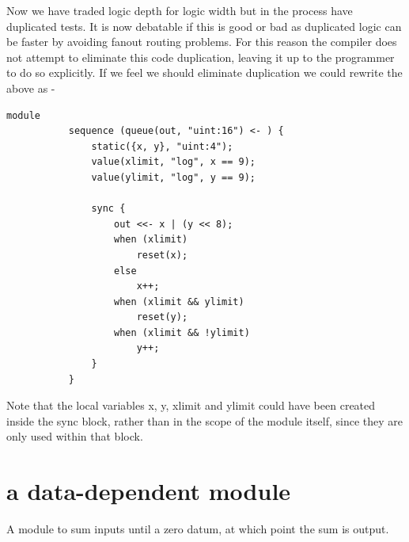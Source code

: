         Now we have traded logic depth for logic width but in the process have
        duplicated tests. It is now debatable if this is good or bad as
        duplicated logic can be faster by avoiding fanout routing problems. For
        this reason the compiler does not attempt to eliminate this code
        duplication, leaving it up to the programmer to do so explicitly. If we
        feel we should eliminate duplication we could rewrite the above as -
        \begin{lstlisting}[gobble=8, language=threepl]
           module
           sequence (queue(out, "uint:16") <- ) {
               static({x, y}, "uint:4");
               value(xlimit, "log", x == 9);
               value(ylimit, "log", y == 9);
               
               sync {
                   out <<- x | (y << 8);
                   when (xlimit)
                       reset(x);
                   else
                       x++;
                   when (xlimit && ylimit)
                       reset(y);
                   when (xlimit && !ylimit)
                       y++;
               }
           }
        \end{lstlisting}
        Note that the local variables x, y, xlimit and ylimit could have been
        created inside the sync block, rather than in the scope of the module
        itself, since they are only used within that block.



    \section{a data-dependent module}\label{sec:exddm}

        A module to sum inputs until a zero datum, at which
        point the sum is output.

